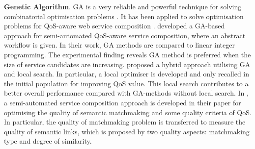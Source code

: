 \textbf{Genetic Algorithm}. 
GA is a very reliable and powerful technique for solving combinatorial optimisation problems \cite{srinivas1994genetic}. It has been applied to solve optimisation problems for QoS-aware web service composition \cite{wang2012survey}. \cite{canfora2005approach} developed a GA-based approach for semi-automated QoS-aware service composition, where an abstract workflow is given. In their work, GA methods are compared to linear integer programming. The experimental finding reveals GA method is preferred when the size of service candidates are increasing.  \cite{tang2010hybrid} proposed a hybrid approach utilising GA and local search. In particular, a local optimiser is developed and only recalled in the initial population for improving QoS value. This local search contributes to a better overall performance compared with GA-methods without local search. In \cite{lecue2009optimizing},  a semi-automated service composition approach is developed in their paper for optimising the quality of semantic matchmaking and some quality criteria of QoS. In particular, the quality of matchmaking problem is transferred to measure the quality of semantic links, which is proposed by two quality aspects: matchmaking type and degree of similarity.

